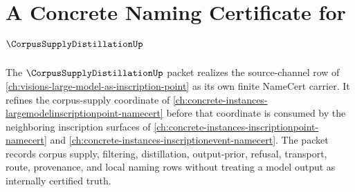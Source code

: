 \chapter{A Concrete Naming Certificate for $\CorpusSupplyDistillationUp$}
\label{ch:concrete-instances-corpus-supply-distillation-namecert}

The $\CorpusSupplyDistillationUp$ packet realizes the source-channel row of \autoref{ch:visions-large-model-as-inscription-point} as its own finite NameCert carrier. It refines the corpus-supply coordinate of \autoref{ch:concrete-instances-largemodelinscriptionpoint-namecert} before that coordinate is consumed by the neighboring inscription surfaces of \autoref{ch:concrete-instances-inscriptionpoint-namecert} and \autoref{ch:concrete-instances-inscriptionevent-namecert}. The packet records corpus supply, filtering, distillation, output-prior, refusal, transport, route, provenance, and local naming rows without treating a model output as internally certified truth.

